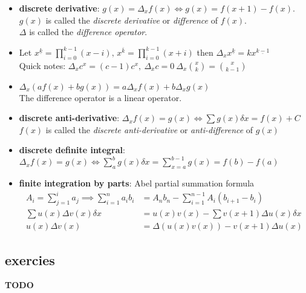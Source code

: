 \documentclass{article}
\newcommand{\blk}[1]{\left({#1}\right)}
\begin{document}
\begin{itemize}
	\item
	      \textbf{discrete derivative}: $g(x)=\Delta_x f(x)\iff g(x)=f(x+1)-f(x)$.\\
	      $g(x)$ is called the \textit{discrete derivative} or \textit{difference} of $f(x)$.\\
	      $\Delta$ is called the \textit{difference operator}.
	\item
	      Let $x^{\underline k}=\prod_{i=0}^{k-1}(x-i),\, x^{\overline k}=\prod_{i=0}^{k-1}(x+i)$
	      then $\Delta_x x^{\underline k}=k x^{\underline {k-1}}$\\
	      Quick notes: $\Delta_x c^x = (c-1)c^x,\ \Delta_x c = 0\ \Delta_x \binom{x}{k}=\binom{x}{k-1}$
	\item
	      $\Delta_x\blk{af(x)+bg(x)}=a\Delta_x f(x)+b\Delta_x g(x)$\\
	      The difference operator is a linear operator.
	\item
	      \textbf{discrete anti-derivative}: $\Delta_x f(x)=g(x)\iff \sum g(x)\delta x=f(x)+C$\\
	      $f(x)$ is called the \textit{discrete anti-derivative} or \textit{anti-difference} of $g(x)$\\
	\item
	      \textbf{discrete definite integral}: $\Delta_x f(x)=g(x) \iff \sum_{a}^b g(x)\delta x = \sum_{x=a}^{b-1} g(x)=f(b)-f(a)$
	\item
	      \textbf{finite integration by parts}: Abel partial summation formula\\
	      \[
		      \begin{aligned}
						A_i=\sum_{j=1}^{i}a_j \implies \sum_{i=1}^{n} a_i b_i
			       & = A_n b_n-\sum_{i=1}^{n-1} A_i (b_{i+1}-b_i)   \\
			      \sum u(x)\Delta v(x) \delta x
			       & =u(x)v(x)-\sum v(x+1) \Delta u(x) \delta x \\
			      u(x)\Delta v(x)
			       & = \Delta \blk{u(x)v(x)} - v(x+1)\Delta u(x)
		      \end{aligned}
	      \]
\end{itemize}

\subsection{exercies}

\textbf{TODO}
\end{document}
